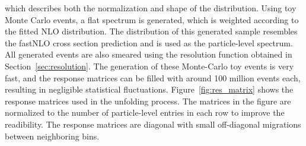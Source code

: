 which describes both the normalization and shape of the distribution. Using toy
Monte Carlo events, a flat \ptavg spectrum is generated, which is weighted
according to the fitted NLO distribution. The distribution of this generated
sample resembles the fastNLO cross section prediction and is used as the
particle-level \ptavg spectrum. All generated events are also smeared using the
resolution function obtained in Section~\ref{sec:resolution}. The generation of
these Monte-Carlo toy events is very fast, and the response matrices can be
filled with around 100 million events each, resulting in negligible statistical
fluctuations. Figure~\ref{fig:res_matrix} shows the response matrices used in
the unfolding process. The matrices in the figure are normalized to the number
of particle-level entries in each row to improve the readibility. The response
matrices are diagonal with small off-diagonal migrations between neighboring
\ptavg bins.

